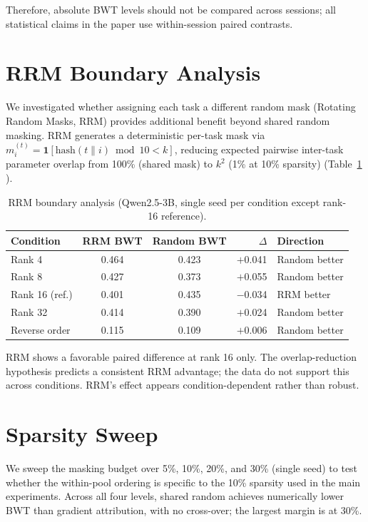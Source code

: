 Therefore, absolute BWT levels should not be compared across sessions; all statistical claims in the paper use within-session paired contrasts.

\section{RRM Boundary Analysis}
\label{app:rrm}

We investigated whether assigning each task a different random mask (Rotating Random Masks, RRM) provides additional benefit beyond shared random masking. RRM generates a deterministic per-task mask via $m^{(t)}_i = \mathbf{1}[\text{hash}(t \| i) \bmod 10 < k]$, reducing expected pairwise inter-task parameter overlap from 100\% (shared mask) to $k^2$ (1\% at 10\% sparsity) (Table~\ref{tab:rrm_boundary} ). 

\begin{table}[h]
\caption{RRM boundary analysis (Qwen2.5-3B, single seed per condition except rank-16 reference).}
\label{tab:rrm_boundary}
\centering
\small
\begin{tabular}{@{}lccrl@{}}
\toprule
\textbf{Condition} & \textbf{RRM BWT} & \textbf{Random BWT} & \textbf{$\Delta$} & \textbf{Direction} \\
\midrule
Rank 4 & 0.464 & 0.423 & $+$0.041 & Random better \\
Rank 8 & 0.427 & 0.373 & $+$0.055 & Random better \\
Rank 16 (ref.) & 0.401 & 0.435 & $-$0.034 & RRM better \\
Rank 32 & 0.414 & 0.390 & $+$0.024 & Random better \\
Reverse order & 0.115 & 0.109 & $+$0.006 & Random better \\
\bottomrule
\end{tabular}
\end{table}

RRM shows a favorable paired difference at rank 16 only. The overlap-reduction hypothesis predicts a consistent RRM advantage; the data do not support this across conditions. RRM's effect appears condition-dependent rather than robust.

\section{Sparsity Sweep}
\label{app:sparsity}

We sweep the masking budget over 5\%, 10\%, 20\%, and 30\% (single seed) to test whether the within-pool ordering is specific to the 10\% sparsity used in the main experiments. Across all four levels, shared random achieves numerically lower BWT than gradient attribution, with no cross-over; the largest margin is at 30\%.

